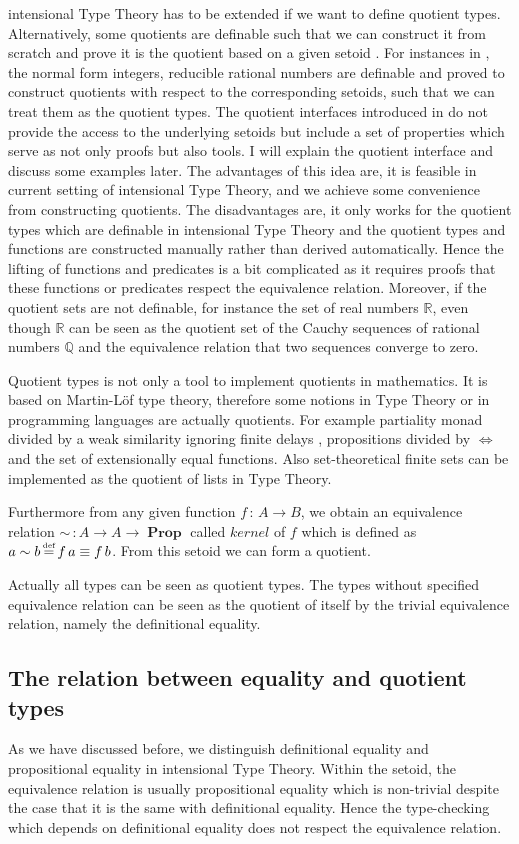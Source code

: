 \documentclass[envcountsame]{llncs}
\newcommand{\Q}{\mathbb{Q}}
\newcommand{\R}{\mathbb{R}}
\DeclareMathOperator{\Prop}{\mathbf{Prop}}
\DeclareMathOperator{\defi}{\stackrel{\text{\tiny def}}{=}}
\newcommand{\itt}{intensional Type Theory}
\newcommand{\mltt}{Martin-L\"{o}f type theory}
\begin{document}
\itt{} has to be extended if we want to define quotient
types. Alternatively, some quotients are definable such that we can
construct it from scratch and prove it is the quotient based on a given setoid
\cite{aan}. For instances in \cite{nuo:10}, the normal form integers,
reducible rational numbers are definable and proved to construct
quotients with respect to the corresponding setoids,  such that we can
treat them as the quotient types. The quotient interfaces introduced in \cite{aan} do not
provide the access to the underlying setoids but include a set of
properties which serve as not only proofs but also tools. I will
explain the quotient interface and discuss some examples
later. The advantages of this idea are, it is feasible in current setting of
intensional Type Theory,  and we achieve some convenience
from constructing quotients. The disadvantages are, it only works for
the quotient types which are definable in \itt{} and the quotient
types and functions are constructed manually rather than derived
automatically. Hence the lifting of functions and predicates is a bit
complicated as it requires proofs that these functions or predicates respect the equivalence
relation\cite{hof:95:sm}.  Moreover, if the quotient sets are not
definable, for instance the set of real numbers $\R$, even though $\R$
can be seen as the quotient set of the Cauchy sequences of rational numbers $\Q$ and the equivalence
relation that two sequences converge to zero. 

Quotient types is not only a tool to implement quotients in
mathematics. It is based on \mltt{}, therefore some notions in Type
Theory or in programming languages are actually quotients. For example partiality monad divided by a weak
similarity ignoring finite delays \cite{aan}, propositions divided by
$\iff$  and the set of extensionally equal functions. Also
set-theoretical finite sets can be implemented as the quotient of
lists in Type Theory. 

Furthermore from any given function $f \,\colon\, A \to B$, we obtain an
equivalence relation $\sim \,\colon A \to A \to \Prop$ called $kernel$
of $f$ which is defined as $a \sim b \defi f \,a \equiv f \,b$. From
this setoid we can form a quotient.

Actually all types can be seen as quotient types. The types without
specified equivalence relation can be seen as the quotient of itself
by the trivial equivalence relation, namely the definitional equality.


\subsection{The relation between equality and quotient types}
As we have discussed before, we distinguish definitional equality
and propositional equality in \itt{}. Within the setoid, the
equivalence relation is usually propositional equality which is
non-trivial despite the case that it is the same with definitional
equality. Hence the type-checking which depends on definitional
equality does not respect the equivalence relation.
\end{document}
